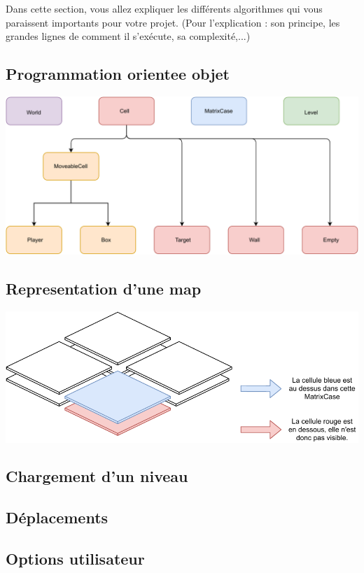 \documentclass[../main.tex]{subfiles}
\begin{document}
Dans cette section, vous allez expliquer les différents algorithmes qui vous paraissent importants pour votre projet. (Pour l'explication : son principe, les grandes lignes de comment il s'exécute, sa complexité,...)

\subsection{Programmation orientee objet}
\includegraphics[width=1\textwidth,clip]{images/objects.pdf}

\subsection{Representation d'une map}
\includegraphics[width=1\textwidth,clip]{images/matrixCase.pdf}

\subsection{Chargement d'un niveau}

\subsection{Déplacements}

\subsection{Options utilisateur}
\end{document}
